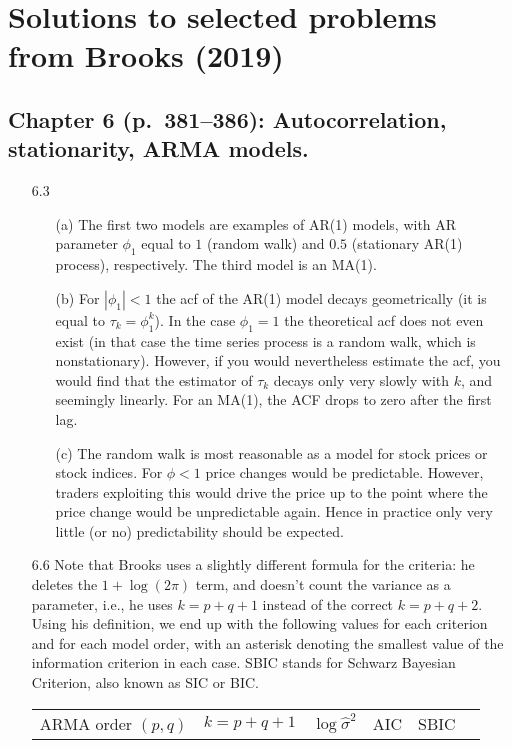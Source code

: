 \documentclass[11pt,a4paper]{article}
\begin{document}
\section*{Solutions to selected problems from Brooks (2019)}
\subsection*{Chapter 6 (p.\ 381--386): Autocorrelation, stationarity, ARMA models.}


\begin{itemize}
\item[6.3]
\begin{enumerate}
\item[(a)] The first two models are examples of AR(1) models, with AR parameter $\phi_1$ equal to $1$ (random walk) and $0.5$ (stationary AR(1) process), respectively. The third model is an MA(1).
\item[(b)] For $|\phi_1| < 1$ the acf of the AR(1) model decays geometrically
(it is equal to $\tau_k = \phi_1^k$).  In the case $\phi_1=1$ the theoretical
acf does not even exist (in that case the time series process is a random walk,
which is nonstationary). However, if you would nevertheless estimate the
acf, you would find that the estimator of $\tau_k$ decays only very slowly
with $k$, and seemingly linearly. For an MA(1), the ACF drops to zero after the first lag.
\item[(c)] The random walk is most reasonable as a model for stock prices or stock indices. For $\phi<1$ price changes would be predictable. However, traders
exploiting this would drive the price up to the point where the price change would be unpredictable again. Hence in practice only very little (or no)
predictability should be expected.
\end{enumerate}
\item[6.6] Note that Brooks uses a slightly different formula for the criteria: he deletes the $1+\log(2\pi)$ term, and doesn't count the variance as a parameter, i.e., he uses $k=p+q+1$ instead of the correct $k=p+q+2$. Using his definition, we end up with the following values for
each criterion and for each model order, with an asterisk denoting the smallest
value of the information criterion in each case. SBIC stands for Schwarz Bayesian Criterion, also known as SIC or BIC.
\begin{center}
\begin{tabular}{ccclll}
ARMA order $(p,q)$ & $k=p+q+1$ & $\log \hat \sigma^2$ & AIC & SBIC \\

\end{tabular}
\end{center}
\end{itemize}
\end{document}
